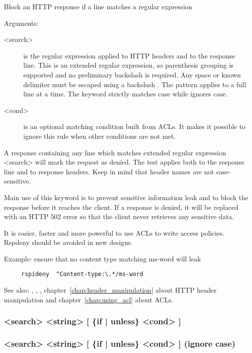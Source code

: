   Block an HTTP response if a line matches a regular expression


  Arguments:
  \begin{description}
  \item[<search>] is the regular expression applied to HTTP headers and to the
              response line. This is an extended regular expression, so
              parenthesis grouping is supported and no preliminary backslash
              is required. Any space or known delimiter must be escaped using
              a backslash \chr{\bslash}. The pattern applies to a full line at a time.
              The  keyword strictly matches case while 
              ignores case.

  \item[<cond>] is an optional matching condition built from ACLs. It makes it
              possible to ignore this rule when other conditions are not met.
  \end{description}

  A response containing any line which matches extended regular expression
  <search> will mark the request as denied. The test applies both to the
  response line and to response headers. Keep in mind that header names are not
  case-sensitive.

  Main use of this keyword is to prevent sensitive information leak and to
  block the response before it reaches the client. If a response is denied, it
  will be replaced with an HTTP 502 error so that the client never retrieves
  any sensitive data.

  It is easier, faster and more powerful to use ACLs to write access policies.
  Rspdeny should be avoided in new designs.

  Example: ensure that no content type matching ms-word will leak
  \begin{verbatim}
     rspideny  ^Content-type:\.*/ms-word
  \end{verbatim}


See also: , , , chapter~\ref{chap:header_manipulation} about HTTP header manipulation
            and chapter~\ref{chap:using_acl} about ACLs.

\subsubsection[rsprep]{ <search> <string> [ \{if | unless\} <cond> ]}
\subsubsection[rspirep]{ <search> <string> [ \{if | unless\} <cond> ]  (ignore case)}

